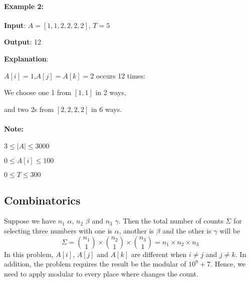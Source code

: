 \paragraph{Example 2:}
\begin{flushleft}
\textbf{Input}: $A = [1,1,2,2,2,2]$, $T = 5$
\par
\textbf{Output}: 12
\par
\textbf{Explanation}: 
\par
$A[i] = 1$,$A[j] = A[k] = 2$ occurs 12 times:
\par
We choose one 1 from $[1,1]$ in 2 ways,
\par
and two 2s from $[2,2,2,2]$ in 6 ways.
\end{flushleft}
\paragraph{Note:}
\begin{flushleft}
$3 \leq |A| \leq 3000$
\par
$0 \leq A[i] \leq 100$
\par
$0 \leq T \leq 300$
\end{flushleft}
\subsection{Combinatorics}
Suppose we have $n_1$ $\alpha$, $n_2$ $\beta$ and $n_3$ $\gamma$. Then the total number of counts $\Sigma$ for selecting three numbers with one is $\alpha$, another is $\beta$ and the other is $\gamma$ will be
\[
\Sigma = \binom{n_1}{1} \times \binom{n_2}{1} \times \binom{n_3}{1} = n_1 \times n_2 \times n_3
\]
In this problem, $A[i]$, $A[j]$ and $A[k]$ are different when $i\neq j $ and $j\neq k$. In addition, the problem requires the result be the modular of $10^9+7$. Hence, we need to apply modular to every place where changes the count.
